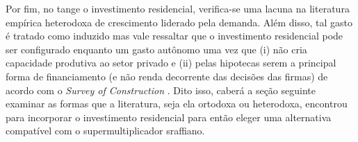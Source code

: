 
Por fim, no tange o investimento residencial, verifica-se uma lacuna na literatura empírica heterodoxa de crescimento liderado pela demanda. Além disso, tal gasto é tratado como induzido \cite{arestis_residential_2015}  mas vale ressaltar que o investimento residencial pode ser configurado enquanto um gasto autônomo uma vez que (i) não cria   capacidade produtiva ao setor privado e (ii) pelas hipotecas serem a principal forma de financiamento (e não renda decorrente das decisões das firmas) de acordo com o \textit{Survey of Construction} \cite{us_census_bureau_characteristics_2017}. Dito isso, caberá a seção seguinte examinar as formas que a literatura, seja ela ortodoxa ou heterodoxa, encontrou para incorporar o investimento residencial para então eleger uma alternativa compatível com o supermultiplicador sraffiano.